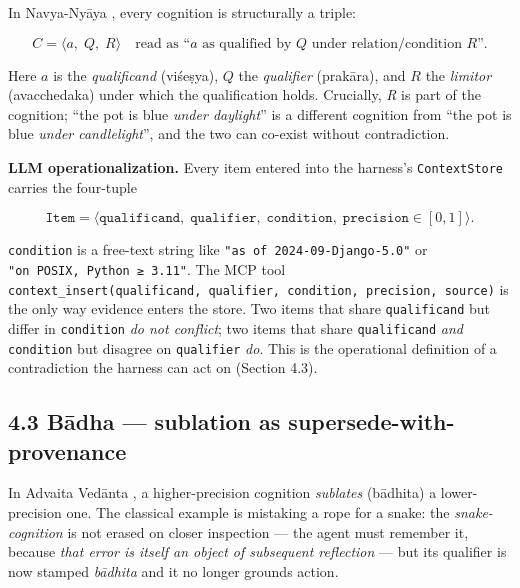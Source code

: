 In Navya-Nyāya \citep{matilal1968navyanyaya, ingalls1951materials, gangesa14tattvacintamani, phillips2012epistemology}, every cognition is structurally a triple:

\[
C = \langle a,\; Q,\; R \rangle \quad\text{read as ``}a\text{ as qualified by }Q\text{ under relation/condition }R\text{''.}
\]

Here \(a\) is the \emph{qualificand} (viśeṣya), \(Q\) the \emph{qualifier} (prakāra), and \(R\) the \emph{limitor} (avacchedaka) under which the qualification holds. Crucially, \emph{R} is part of the cognition; ``the pot is blue \emph{under daylight}'' is a different cognition from ``the pot is blue \emph{under candlelight}'', and the two can co-exist without contradiction.

\textbf{LLM operationalization.} Every item entered into the harness's \texttt{ContextStore} carries the four-tuple

\[
\texttt{Item} = \big\langle \texttt{qualificand},\; \texttt{qualifier},\; \texttt{condition},\; \texttt{precision}\in[0,1] \big\rangle.
\]

\texttt{condition} is a free-text string like \texttt{"as\ of\ 2024-09-Django-5.0"} or \texttt{"on\ POSIX,\ Python\ ≥\ 3.11"}. The MCP tool \texttt{context\_insert(qualificand,\ qualifier,\ condition,\ precision,\ source)} is the only way evidence enters the store. Two items that share \texttt{qualificand} but differ in \texttt{condition} \emph{do not conflict}; two items that share \texttt{qualificand} \emph{and} \texttt{condition} but disagree on \texttt{qualifier} \emph{do}. This is the operational definition of a contradiction the harness can act on (Section 4.3).

\subsection{4.3 Bādha --- sublation as supersede-with-provenance}\label{bux101dha-sublation-as-supersede-with-provenance}

In Advaita Vedānta \citep{deutsch1969advaita, shaw1990bada, dharmaraja17vedantaparibhasa, sankaraupadesha}, a higher-precision cognition \emph{sublates} (bādhita) a lower-precision one. The classical example is mistaking a rope for a snake: the \emph{snake-cognition} is not erased on closer inspection --- the agent must remember it, because \emph{that error is itself an object of subsequent reflection} --- but its qualifier is now stamped \emph{bādhita} and it no longer grounds action.

